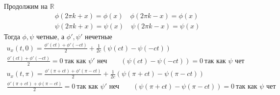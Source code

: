 	Продолжим на $\mathbb{R}$
	\begin{gather*}
		\phi(2\pi k + x) = \phi(x)\quad \phi(2\pi k - x) = \phi(x)\\
		\psi(2\pi k + x) = \psi(x)\quad \psi(2\pi k - x) = \psi(x)
	\end{gather*}
	Тогда $\phi, \psi$ четные, а $\phi', \psi'$ нечетные
	\begin{gather*}
		u_{x}(t,0) = \frac{\phi'(ct) + \phi'(-ct)}{2} + \frac{1}{2c}(\psi(ct) - \psi(-ct))\\
		\frac{\phi'(ct) + \phi'(-ct)}{2} = 0\ \text{так как $\psi'$ неч}\qquad
		(\psi(ct) - \psi(-ct)) = 0\ \text{так как $\psi$ чет}\\
		u_{x}(t,\pi) = \frac{\phi'(\pi + ct) + \phi'(\pi - ct)}{2} + \frac{1}{2c}(\psi(\pi + ct) - \psi(\pi - ct))\\
		\frac{\phi'(\pi + ct) + \phi(\pi - ct)}{2} = 0\ \text{так как $\psi'$ неч}\qquad
		(\psi(\pi + ct) - \psi(\pi - ct)) = 0\ \text{так как $\psi$ чет}
	\end{gather*}
\vskip 0.4in

